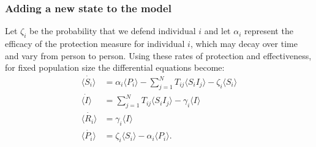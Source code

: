 \documentclass[../report.tex]{subfiles}
\begin{document}
\subsubsection{Adding a new state to the model}

Let $\zeta_i$ be the probability that we defend individual $i$ and let $\alpha_i$ represent the efficacy of the protection measure for individual $i$, which may decay over time and vary from person to person. Using these rates of protection and effectiveness, for fixed population size the differential equations become:
\begin{align*}
\dot{\langle S_i \rangle} & = \alpha_i \langle P_i \rangle - \sum^{N}_{j=1}T_{ij} \langle S_i I_j \rangle - \zeta_i\langle S_i \rangle\\
\dot{\langle I \rangle} & =\sum^{N}_{j=1}T_{ij}\langle S_i I_j \rangle - \gamma_i \langle I \rangle \\
\dot{\langle R_i \rangle} & = \gamma_i \langle I \rangle \\
\dot{\langle P_i \rangle} & = \zeta_i \langle S_i \rangle - \alpha_i \langle P_i \rangle.
\end{align*} 
\end{document}

